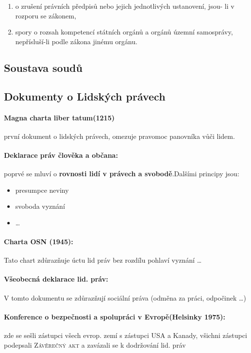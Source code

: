 \documentclass[10pt,a4paper,
twoside,%
]{report}
\begin{document}
\begin{small}
\begin{enumerate}
\begin{enumerate}
\item o zrušení právních předpisů nebo jejich jednotlivých ustanovení, jsou- li v rozporu se zákonem,
\item spory o rozsah kompetencí státních orgánů a orgánů územní samosprávy, nepřísluší-li podle zákona jinému orgánu.

\end{enumerate}
\end{enumerate}
\end{small}

\subsection{Soustava soudů}

\subsection{Dokumenty o Lidských právech}

\paragraph{Magna charta liber tatum(1215)} první dokument o lidských právech, omezuje pravomoc panovníka vůči lidem.

\paragraph{Deklarace práv člověka a občana:} poprvé se mluví o \textbf{rovnosti lidí v právech a svobodě}.Dalšími principy jsou: \begin{itemize}
\item presumpce neviny
\item svoboda vyznání
\item \dots
\end{itemize}

\paragraph{Charta OSN (1945):}Tato chart zdůrazňuje úctu lid práv bez rozdílu pohlaví vyznání \dots

\paragraph{Všeobecná deklarace lid. práv:} V tomto dokumentu se zdůrazňují sociální práva (odměna za práci, odpočinek \dots)

\paragraph{Konference o bezpečnosti a spolupráci v Evropě(Helsinky 1975):} zde se sešli zástupci všech evrop. zemí s zástupci USA a Kanady, všichni zástupci podepsali \textsc{Závěrečný akt} a zavázali se k dodržování lid. práv
\end{document}
